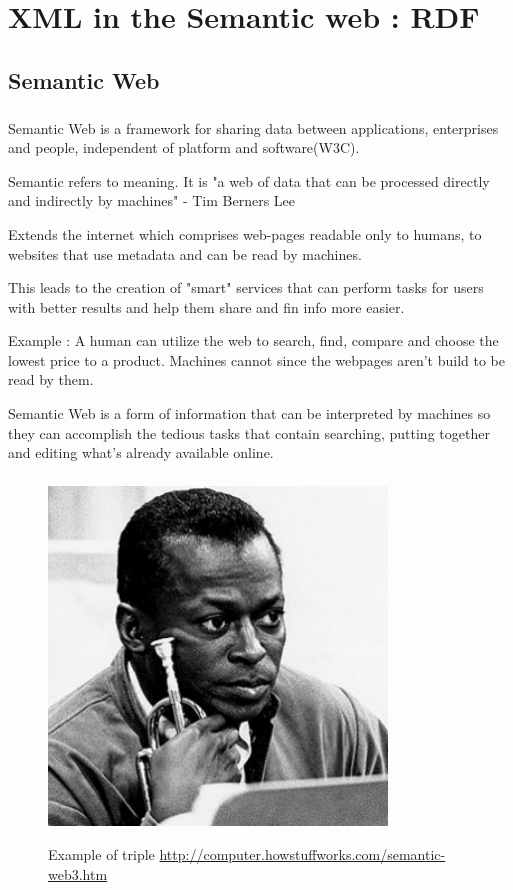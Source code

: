 \documentclass[a4paper,11pt]{report}
\begin{document}
\chapter{XML in the Semantic web : RDF}

\section{Semantic Web}

\paragraph{}Semantic Web is a framework for sharing data between applications, enterprises and people, independent of platform and software(W3C).

Semantic refers to  {\color{red}meaning}. It is "a web of data that can be processed directly and indirectly by machines" - Tim Berners Lee

Extends the internet which comprises web-pages readable only to humans, to websites that use metadata and can be read by machines.

This leads to the creation of "smart" services that can perform tasks for users with better results and help them share and fin info more easier.

Example : A human can utilize the web to search, find, compare and choose the lowest price to a product. Machines cannot since the webpages aren't build to be read by them.

Semantic Web is a form of information that can be interpreted by machines so they can accomplish the tedious tasks that contain searching, putting together and editing what's already available online.

\paragraph{}

\begin{figure}[h]
	\centering
		\includegraphics[width=90mm]{images/semantic-web-3.jpg}~\\[1cm]
		\caption {Example of triple \url {http://computer.howstuffworks.com/semantic-web3.htm}}
\end{figure}
\end{document}
